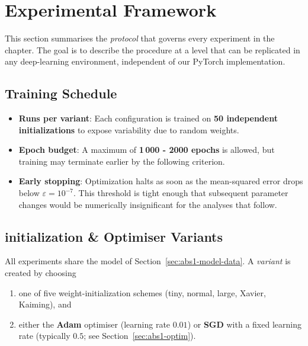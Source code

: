 ﻿%
\section{Experimental Framework}
\label{sec:abs1-framework}

This section summarises the \emph{protocol} that governs every experiment in
the chapter.  The goal is to describe the procedure at a level that can be
replicated in any deep-learning environment, independent of our PyTorch
implementation.

\subsection*{Training Schedule}

\begin{itemize}
  \item \textbf{Runs per variant}: Each configuration is trained
        on \textbf{50 independent initializations} to expose variability due
        to random weights.
  \item \textbf{Epoch budget}: A maximum of \textbf{1\,000 - 2000 epochs} is allowed, but training may
        terminate earlier by the following criterion.
  \item \textbf{Early stopping}: Optimization halts as soon as the
        mean-squared error drops below
        \(\displaystyle\varepsilon = 10^{-7}\).
        This threshold is tight enough that subsequent parameter changes would
        be numerically insignificant for the analyses that follow.
\end{itemize}

\subsection*{initialization \& Optimiser Variants}

All experiments share the model of Section~\ref{sec:abs1-model-data}.  
A \emph{variant} is created by choosing

\begin{enumerate}
  \item one of five weight-initialization schemes  
        (tiny, normal, large, Xavier, Kaiming), and
  \item either the \textbf{Adam} optimiser (learning rate \(0.01\))  
        or \textbf{SGD} with a fixed learning rate (typically \(0.5\); see
        Section~\ref{sec:abs1-optim}).
\end{enumerate}

